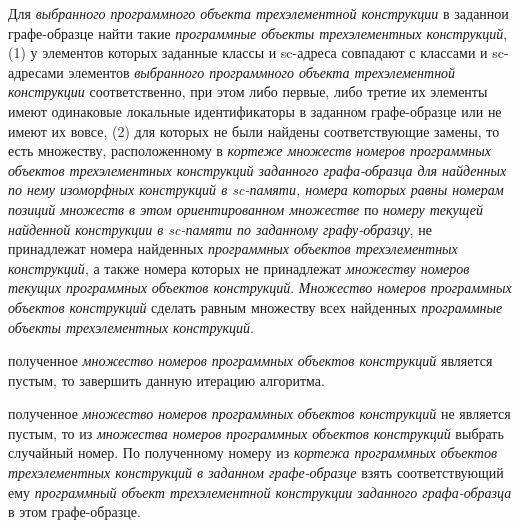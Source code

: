 \begin{textitemize}
	\item Для \textit{выбранного программного объекта трехэлементной конструкции} в заданнои графе-образце найти  такие \textit{программные объекты трехэлементных конструкций}, (1) у элементов которых заданные классы и sc-адреса совпадают с классами и sc-адресами элементов \textit{выбранного программного объекта трехэлементной конструкции} соответственно, при этом либо первые, либо третие их элементы имеют одинаковые локальные идентификаторы в заданном графе-образце или не имеют их вовсе, (2) для которых не были найдены соответствующие замены, то есть множеству, расположенному в \textit{кортеже множеств номеров программных объектов трехэлементных конструкций заданного графа-образца для найденных по нему изоморфных конструкций в sc-памяти, номера которых равны номерам позиций множеств в этом ориентированном множестве} по \textit{номеру текущей найденной конструкции в sc-памяти по заданному графу-образцу}, не принадлежат номера найденных \textit{программных объектов трехэлементных конструкций}, а также номера которых не принадлежат \textit{множеству номеров текущих программных объектов конструкций}. \textit{Множество номеров  программных объектов конструкций} сделать равным множеству всех найденных \textit{программные объекты трехэлементных конструкций}.
	\item {} полученное \textit{множество номеров  программных объектов конструкций} является пустым, то завершить данную итерацию алгоритма.
	\item {} полученное \textit{множество номеров  программных объектов конструкций} не является пустым, то из \textit{множества номеров  программных объектов конструкций} выбрать случайный номер. По полученному номеру из \textit{кортежа программных объектов трехэлементных конструкций в заданном графе-образце} взять соответствующий ему \textit{программный объект трехэлементной конструкции заданного графа-образца} в этом графе-образце.

\end{textitemize}

